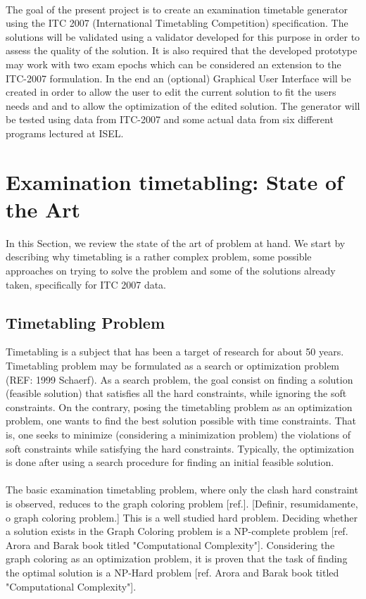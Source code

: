 \\
The goal of the present project is to create an examination timetable generator using the ITC 2007 (International Timetabling Competition) specification. The solutions will be validated using a validator developed for this purpose in order to assess the quality of the solution. It is also required that the developed prototype may work with two exam epochs which can be considered an extension to the ITC-2007 formulation. In the end an (optional) Graphical User Interface will be created in order to allow the user to edit the current solution to fit the users needs and and to allow the optimization of the edited solution. The generator will be tested using data from ITC-2007 and some actual data from six different programs lectured at ISEL.\\
\section{Examination timetabling: State of the Art}
\label{sec:sota}
In this Section, we review the state of the art of problem at hand. We start by describing why timetabling is a rather complex problem, some possible approaches on trying to solve the problem and some of the solutions already taken, specifically for ITC 2007 data.
\subsection{Timetabling Problem}
Timetabling is a subject that has been a target of research for about 50 years. 
Timetabling problem may be formulated as a search or optimization problem (REF: 1999 Schaerf). As a search problem, the goal consist on ﬁnding a solution (feasible solution) that satisﬁes all the hard constraints, while ignoring the soft constraints. On the contrary, posing the timetabling problem as an optimization problem, one wants to find the best solution possible with time constraints. That is, one seeks to minimize (considering a minimization problem) the violations of soft constraints while satisfying the hard
constraints. Typically, the optimization is done after using a search procedure for finding an initial feasible solution.\\
\\
The basic examination timetabling problem, where only the clash hard constraint is observed, reduces to the graph coloring problem [ref.]. 
[Definir, resumidamente, o graph coloring problem.]
This is a well studied hard problem. Deciding whether a solution exists in the Graph Coloring problem is a NP-complete problem [ref. Arora and Barak book titled "Computational Complexity"]. Considering the graph coloring as an optimization problem, it is proven that the task of finding the optimal solution is a NP-Hard problem [ref. Arora and Barak book titled "Computational Complexity"].\\
\\


